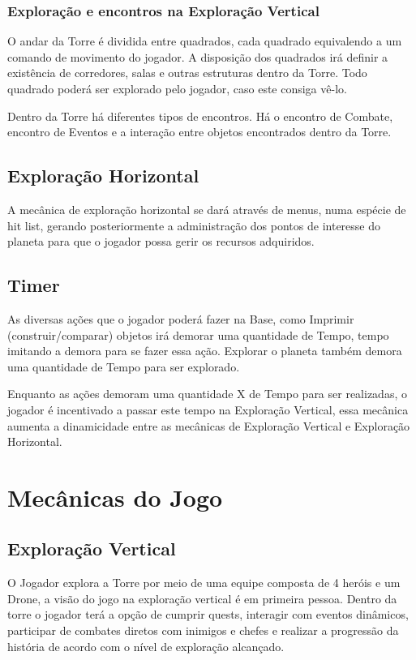 \documentclass[11pt]{article} %
\begin{document}
\subsubsection{Exploração e encontros na Exploração Vertical}
O andar da Torre é dividida entre quadrados, cada quadrado equivalendo a um comando de movimento do jogador. A disposição dos quadrados irá definir a existência de corredores, salas e outras estruturas dentro da Torre. Todo quadrado poderá ser explorado pelo jogador, caso este consiga vê-lo.

Dentro da Torre há diferentes tipos de encontros. Há o encontro de Combate, encontro de Eventos e a interação entre objetos encontrados dentro da Torre.

\subsection{Exploração Horizontal}
A mecânica de exploração horizontal se dará através de menus, numa espécie de hit list, gerando posteriormente a administração dos pontos de interesse do planeta para que o jogador possa gerir os recursos adquiridos.

\subsection{Timer}
As diversas ações que o jogador poderá fazer na Base, como Imprimir (construir/comparar) objetos irá demorar uma quantidade de Tempo, tempo imitando a demora para se fazer essa ação. Explorar o planeta também demora uma quantidade de Tempo para ser explorado.

Enquanto as ações demoram uma quantidade X de Tempo para ser realizadas, o jogador é incentivado a passar este tempo na Exploração Vertical, essa mecânica aumenta a dinamicidade entre as mecânicas de Exploração Vertical e Exploração Horizontal.

\section{Mecânicas do Jogo}

\subsection{Exploração Vertical}
O Jogador explora a Torre por meio de uma equipe composta de 4 heróis e um Drone, a visão do jogo na exploração vertical é em primeira pessoa. Dentro da torre o jogador terá a opção de cumprir quests, interagir com eventos dinâmicos, participar de combates diretos com inimigos e chefes e realizar a progressão da história de acordo com o nível de exploração alcançado.
\end{document}
